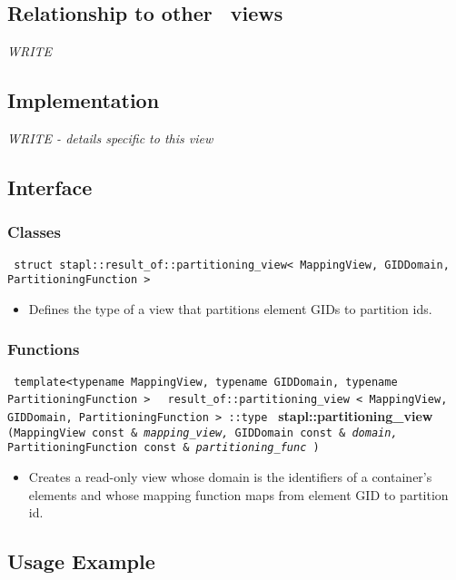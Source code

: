 \subsection{Relationship to other \stapl\ views}

\textit{WRITE}

\subsection{Implementation}

\textit{WRITE - details specific to this view}

\subsection{Interface} \label{sec-dist-part-vw-inter}

\subsubsection{Classes}

\noindent
\texttt{%
struct stapl::result\_of::partitioning\_view< MappingView,
GIDDomain, PartitioningFunction >
}

\begin{itemize}
\item
Defines the type of a view that partitions element GIDs to partition ids.
\end{itemize}

\subsubsection{Functions}

\noindent
\texttt{%
template<typename MappingView, typename GIDDomain, typename PartitioningFunction >
}
\texttt{%
result\_of::partitioning\_view < MappingView, GIDDomain, PartitioningFunction > ::type
}
\newline
\textbf{stapl::partitioning\_view}%
\texttt{%
(MappingView const \&
\textit{mapping\_view,}%
GIDDomain const \&
\textit{domain,}%
PartitioningFunction const \&
\textit{partitioning\_func}%
)
}

\begin{itemize}
\item
Creates a read-only view whose domain is the identifiers of a container's elements and whose mapping function maps from element GID to partition id.
\end{itemize}

\subsection{Usage Example} \label{sec-dist-part-vw-use}

